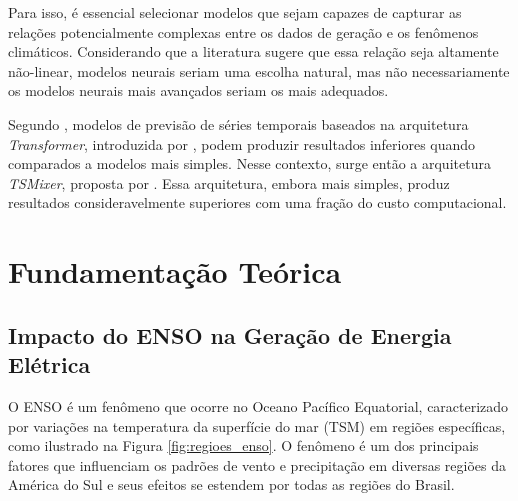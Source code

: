 Para isso, é essencial selecionar modelos que sejam capazes de capturar as relações potencialmente complexas entre os
dados de geração e os fenômenos climáticos. Considerando que a literatura sugere que essa relação seja altamente não-linear,
modelos neurais seriam uma escolha natural, mas não necessariamente os modelos neurais mais avançados seriam os mais adequados.

Segundo , modelos de previsão de séries temporais baseados na arquitetura \textit{Transformer}, introduzida 
por , podem produzir resultados inferiores quando comparados a modelos mais simples. Nesse contexto,
surge então a arquitetura \textit{TSMixer}, proposta por . Essa arquitetura, embora mais simples, produz resultados 
consideravelmente superiores com uma fração do custo computacional. 


\chapter{Fundamentação Teórica}
\section{Impacto do ENSO na Geração de Energia Elétrica}
O ENSO é um fenômeno que ocorre no Oceano Pacífico Equatorial, caracterizado por variações na temperatura da superfície
do mar (TSM) em regiões específicas, como ilustrado na Figura \ref{fig:regioes_enso}. O fenômeno é um dos principais fatores 
que influenciam os padrões de vento e precipitação em diversas regiões da América do Sul e seus efeitos se estendem por 
todas as regiões do Brasil. \cite{Andreoli2016}

\begin{figure}[!ht]
	{}
	{}
\end{figure}

